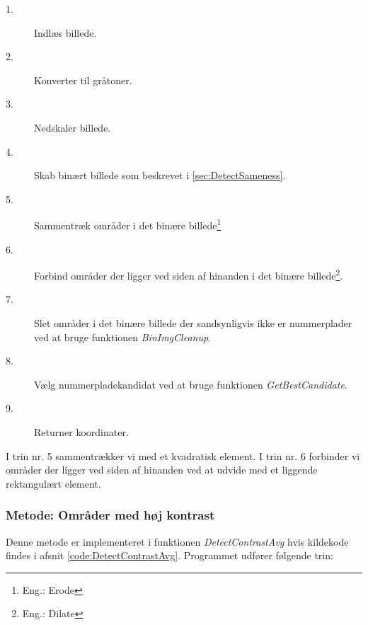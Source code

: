 \begin{description}
\item[1.] Indlæs billede.
\item[2.] Konverter til gråtoner.
\item[3.] Nedskaler billede.
\item[4.] Skab binært billede som beskrevet i \ref{sec:DetectSameness}.
\item[5.] Sammentræk områder i det binære billede\footnote{Eng.: Erode}
\item[6.] Forbind områder der ligger ved siden af hinanden i det binære billede\footnote{Eng.: Dilate}.
\item[7.] Slet områder i det binære billede der sandsynligvis ikke er nummerplader ved at bruge funktionen \textit{BinImgCleanup}.
\item[8.] Vælg nummerpladekandidat ved at bruge funktionen \textit{GetBestCandidate}.
\item[9.] Returner koordinater.
\end{description}

I trin nr. 5 sammentrækker vi med et kvadratisk element. I trin nr. 6 forbinder vi områder der ligger ved siden af hinanden ved at udvide med et liggende rektangulært element. 


\subsubsection{Metode: Områder med høj kontrast}
Denne metode er implementeret i funktionen \textit{DetectContrastAvg} hvis kildekode findes i afsnit \vref{code:DetectContrastAvg}. Programmet udfører følgende trin:

